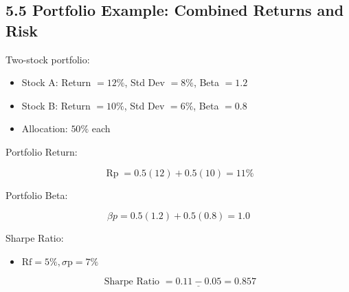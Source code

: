 \documentclass[10pt]{article}
\begin{document}
\subsection*{5.5 Portfolio Example: Combined Returns and Risk}
Two-stock portfolio:

\begin{itemize}
  \item Stock A: Return $=12 \%$, Std Dev $=8 \%$, Beta $=1.2$
  \item Stock B: Return $=10 \%$, Std Dev $=6 \%$, Beta $=0.8$
  \item Allocation: $50 \%$ each
\end{itemize}

Portfolio Return:

$$
\operatorname{Rp}=0.5(12)+0.5(10)=11 \%
$$

Portfolio Beta:

$$
\beta p=0.5(1.2)+0.5(0.8)=1.0
$$

Sharpe Ratio:

\begin{itemize}
  \item $\mathrm{Rf}=5 \%, \sigma \mathrm{p}=7 \%$
\end{itemize}

$$
\text { Sharpe Ratio }=\underline{0.11-0.05}=0.857
$$
\end{document}
